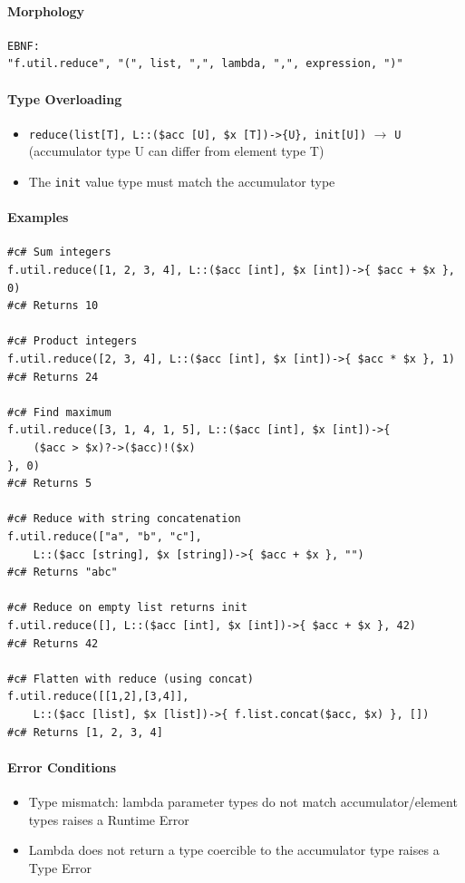 \paragraph{Morphology}
\begin{verbatim}
EBNF:
"f.util.reduce", "(", list, ",", lambda, ",", expression, ")"
\end{verbatim}

\paragraph{Type Overloading}
\begin{itemize}
\item \texttt{reduce(list[T], L::(\$acc [U], \$x [T])->\{U\}, init[U])} $\rightarrow$ \texttt{U}
  (accumulator type U can differ from element type T)
\item The \texttt{init} value type must match the accumulator type
\end{itemize}

\paragraph{Examples}
\begin{verbatim}
#c# Sum integers
f.util.reduce([1, 2, 3, 4], L::($acc [int], $x [int])->{ $acc + $x }, 0)
#c# Returns 10

#c# Product integers
f.util.reduce([2, 3, 4], L::($acc [int], $x [int])->{ $acc * $x }, 1)
#c# Returns 24

#c# Find maximum
f.util.reduce([3, 1, 4, 1, 5], L::($acc [int], $x [int])->{ 
    ($acc > $x)?->($acc)!($x) 
}, 0)
#c# Returns 5

#c# Reduce with string concatenation
f.util.reduce(["a", "b", "c"],
    L::($acc [string], $x [string])->{ $acc + $x }, "")
#c# Returns "abc"

#c# Reduce on empty list returns init
f.util.reduce([], L::($acc [int], $x [int])->{ $acc + $x }, 42)
#c# Returns 42

#c# Flatten with reduce (using concat)
f.util.reduce([[1,2],[3,4]],
    L::($acc [list], $x [list])->{ f.list.concat($acc, $x) }, [])
#c# Returns [1, 2, 3, 4]
\end{verbatim}

\paragraph{Error Conditions}
\begin{itemize}
\item Type mismatch: lambda parameter types do not match accumulator/element types raises a Runtime Error
\item Lambda does not return a type coercible to the accumulator type raises a Type Error
\end{itemize}

